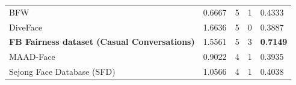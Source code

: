 \documentclass[journal]{IEEEtran}
\begin{document}
\begin{table}[!t]
\begin{tabular}{|p{}|C{0.11\textwidth}|C{0.11\textwidth}|C{0.11\textwidth}|C{0.11\textwidth}|}
BFW \cite{robinson2020face}                                                             & 0.6667                           & 5                               & 1                                  & 0.4333                    \\
DiveFace \cite{morales2020sensitivenets}                                                & 1.6636                           & 5                               & 0                                  & 0.3887                    \\
\textbf{FB Fairness dataset (Casual Conversations)} \cite{hazirbas2021towards}                   & 1.5561                           & 5                               & 3                                  & \textbf{0.7149}                    \\
MAAD-Face \cite{terhorst2021maad}                                                       & 0.9022                           & 4                               & 1                                  & 0.3935                    \\
Sejong Face Database (SFD) \cite{cheema2021sejong}                                      & 1.0566                           & 4                               & 1                                  & 0.4038                    \\ \hline
\end{tabular}
\end{table}
\end{document}
